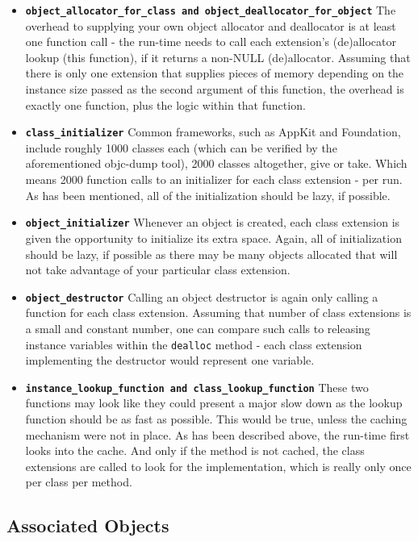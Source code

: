 \begin{itemize}
  \item{\bf{\tt{object\_allocator\_for\_class} and \tt{object\_deallocator\_for\_object}}} The overhead to supplying your own object allocator and deallocator is at least one function call - the run-time needs to call each extension's (de)allocator lookup (this function), if it returns a non-NULL (de)allocator. Assuming that there is only one extension that supplies pieces of memory depending on the instance size passed as the second argument of this function, the overhead is exactly one function, plus the logic within that function.
  \item{\bf{\tt{class\_initializer}}} Common frameworks, such as AppKit and Foundation, include roughly 1000 classes each (which can be verified by the aforementioned objc-dump tool), 2000 classes altogether, give or take. Which means 2000 function calls to an initializer for each class extension - per run. As has been mentioned, all of the initialization should be lazy, if possible.
  \item{\bf{\tt{object\_initializer}}} Whenever an object is created, each class extension is given the opportunity to initialize its extra space. Again, all of initialization should be lazy, if possible as there may be many objects allocated that will not take advantage of your particular class extension.
  \item{\bf{\tt{object\_destructor}}} Calling an object destructor is again only calling a function for each class extension. Assuming that number of class extensions is a small and constant number, one can compare such calls to releasing instance variables within the \texttt{dealloc} method - each class extension implementing the destructor would represent one variable.
  \item{\bf{\tt{instance\_lookup\_function} and \tt{class\_lookup\_function}}} These two functions may look like they could present a major slow down as the lookup function should be as fast as possible. This would be true, unless the caching mechanism were not in place. As has been described above, the run-time first looks into the cache. And only if the method is not cached, the class extensions are called to look for the implementation, which is really only once per class per method.
\end{itemize}

\subsection{Associated Objects}

